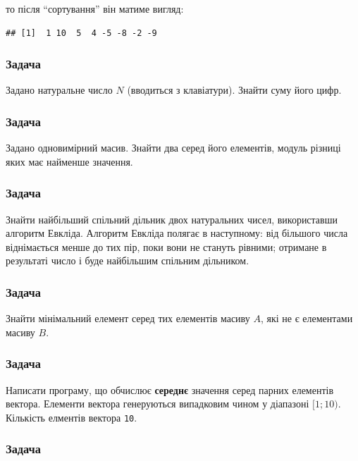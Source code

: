\documentclass[
]{book}
\begin{document}
то після ``сортування'' він матиме вигляд:

\begin{verbatim}
## [1]  1 10  5  4 -5 -8 -2 -9
\end{verbatim}

\hypertarget{task6115}{%
\subsubsection{Задача}\label{task6115}}

Задано натуральне число \(N\) (вводиться з клавіатури). Знайти суму його цифр.

\hypertarget{task6116}{%
\subsubsection{Задача}\label{task6116}}

Задано одновимірний масив. Знайти два серед його елементів, модуль різниці яких має
найменше значення.

\hypertarget{task6117}{%
\subsubsection{Задача}\label{task6117}}

Знайти найбільший спільний дільник двох натуральних чисел, використавши алгоритм
Евкліда. Алгоритм Евкліда полягає в наступному: від більшого числа віднімається менше до тих пір,
поки вони не стануть рівними; отримане в результаті число і буде найбільшим спільним дільником.

\hypertarget{task6118}{%
\subsubsection{Задача}\label{task6118}}

Знайти мінімальний елемент серед тих елементів масиву \(A\), які не є елементами масиву \(B\).

\hypertarget{task6119}{%
\subsubsection{Задача}\label{task6119}}

Написати програму, що обчислює \textbf{середнє} значення серед парних елементів вектора. Елементи вектора генеруються випадковим чином у діапазоні \([1; 10)\). Кількість елментів вектора \texttt{10}.

\hypertarget{task6120}{%
\subsubsection{Задача}\label{task6120}}
\end{document}
